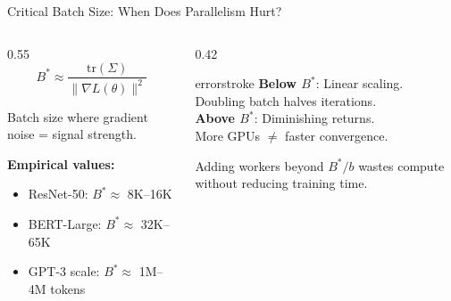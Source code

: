 \documentclass[aspectratio=169, 12pt]{beamer}
\begin{document}
\begin{frame}{Critical Batch Size: When Does Parallelism Hurt?}

\small
\begin{columns}[T]
  \begin{column}{0.55\textwidth}
    $$B^* \approx \frac{\text{tr}(\Sigma)}{\|\nabla L(\theta)\|^2}$$

    \vspace{0.1cm}
    {\footnotesize Batch size where gradient noise = signal strength.}

    \vspace{0.15cm}
    \textbf{Empirical values:}
    \begin{itemize}\setlength\itemsep{0pt}
      \item {\footnotesize ResNet-50: $B^* \approx$ 8K--16K}
      \item {\footnotesize BERT-Large: $B^* \approx$ 32K--65K}
      \item {\footnotesize GPT-3 scale: $B^* \approx$ 1M--4M tokens}
    \end{itemize}
  \end{column}
  \begin{column}{0.42\textwidth}
    \begin{mlsyscard}{errorstroke}
    \textbf{Below $B^*$}: Linear scaling.\\
    Doubling batch halves iterations.\\[0.1cm]
    \textbf{Above $B^*$}: Diminishing returns.\\
    More GPUs $\neq$ faster convergence.
    \end{mlsyscard}

    \vspace{0.1cm}
    {\scriptsize Adding workers beyond $B^*/b$ wastes compute without reducing training time.}
  \end{column}
\end{columns}

\end{frame}
\end{document}
